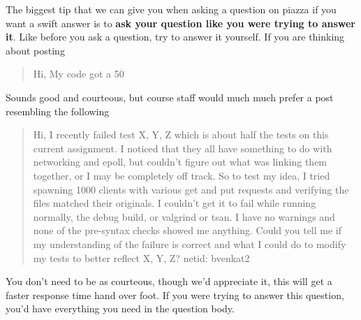 The biggest tip that we can give you when asking a question on piazza if you want a swift answer is to \textbf{ask your question like you were trying to answer it}. Like before you ask a question, try to answer it yourself. If you are thinking about posting

\begin{quote}
Hi, My code got a 50%
\end{quote}

Sounds good and courteous, but course staff would much much prefer a post resembling the following

\begin{quote}
Hi, I recently failed test X, Y, Z which is about half the tests on this current assignment. I noticed that they all have something to do with networking and epoll, but couldn't figure out what was linking them together, or I may be completely off track. So to test my idea, I tried spawning 1000 clients with various get and put requests and verifying the files matched their originals. I couldn't get it to fail while running normally, the debug build, or valgrind or tsan. I have no warnings and none of the pre-syntax checks showed me anything. Could you tell me if my understanding of the failure is correct and what I could do to modify my tests to better reflect X, Y, Z? netid: bvenkat2
\end{quote}

You don't need to be as courteous, though we'd appreciate it, this will get a faster response time hand over foot. If you were trying to answer this question, you'd have everything you need in the question body.



